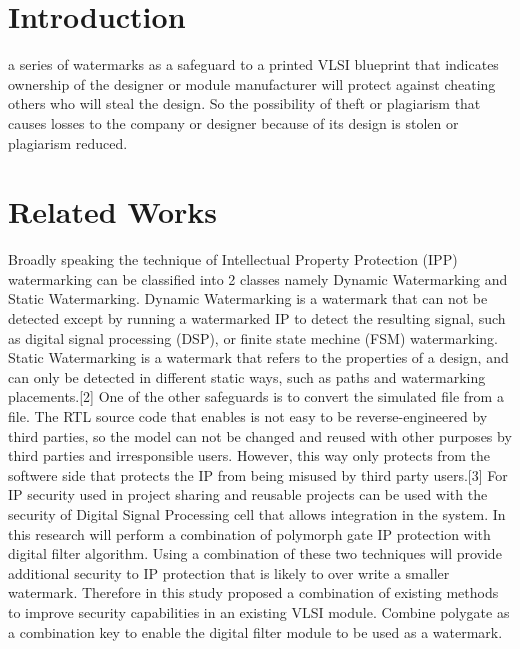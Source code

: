 \documentclass[10pt,journal,compsoc]{IEEEtran}
\begin{document}
\maketitle
\IEEEdisplaynontitleabstractindextext
\IEEEpeerreviewmaketitle

\ifCLASSOPTIONcompsoc
\else
	\section{Introduction}
	\label{sec:introduction}
\fi

 a series of watermarks as a safeguard to a printed VLSI blueprint that indicates ownership of the designer or module manufacturer will protect against cheating others who will steal the design. So the possibility of theft or plagiarism that causes losses to the company or designer because of its design is stolen or plagiarism reduced.\cite{IEEEhowto:kopka}

 

\section{Related Works}
Broadly speaking the technique of Intellectual Property Protection (IPP) watermarking can be classified into 2 classes namely Dynamic Watermarking and Static Watermarking. Dynamic Watermarking is a watermark that can not be detected except by running a watermarked IP to detect the resulting signal, such as digital signal processing (DSP), or finite state mechine (FSM) watermarking. Static Watermarking is a watermark that refers to the properties of a design, and can only be detected in different static ways, such as paths and watermarking placements.[2] One of the other safeguards is to convert the simulated file from a file. The RTL source code that enables is not easy to be reverse-engineered by third parties, so the model can not be changed and reused with other purposes by third parties and irresponsible users. However, this way only protects from the softwere side that protects the IP from being misused by third party users.[3] For IP security used in project sharing and reusable projects can be used with the security of Digital Signal Processing cell that allows integration in the system. In this research will perform a combination of polymorph gate IP protection with digital filter algorithm. Using a combination of these two techniques will provide additional security to IP protection that is likely to over write a smaller watermark. Therefore in this study proposed a combination of existing methods to improve security capabilities in an existing VLSI module. Combine polygate as a combination key to enable the digital filter module to be used as a watermark.
\end{document}
